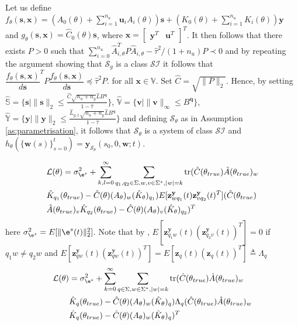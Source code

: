 \documentclass{ifacconf}
\def\rvq{{\mathbf{q}}}
\def\rvw{{\mathbf{w}}}
\def\rvy{{\mathbf{y}}}
\def\rvz{{\mathbf{z}}}
\def\vs{{\bm{s}}}
\def\vu{{\bm{u}}}
\def\vv{{\bm{v}}}
\def\vx{{\bm{x}}}
\def\vy{{\bm{y}}}
\newcommand{\class}{\(\mathcal{SI}\)}
\begin{document}
 \begin{pf}
Let us define $f_{\theta}(\vs,\vx)=(A_{0}(\theta)+\sum_{i=1}^{n_u} \vu_i A_{i}(\theta))\vs+(K_{0}(\theta)+\sum_{i=1}^{n_u} K_{i}(\theta))\vy$
and $g_{\theta}(\vs,\vx)=\hat{C}_{0}(\theta)\vs$, where $\vx=\begin{bmatrix} \vy^T & \vu^T \end{bmatrix}^T$.
It then follows that there exists $P > 0$ such that $\sum_{i=0}^{n_u} \hat{A}_{i,\theta}^T P \hat{A}_{i,\theta} - \hat{\tau}^2/(1+n_u) P \prec 0$ and by repeating the argument showing that $\mathcal{S}_g$ is a class \class{} it follows that
$\dfrac{f_{\theta}(\vs,\vx)}{d\vs}^T P \dfrac{f_{\theta}(\vs,\vx)}{d\vs} \preceq \hat{\tau}^2 P$.
for all $\vx \in \mathbb{V}$. 
Set $\hat{C}=\sqrt{\|P\|_2}$. 
Hence, by setting $\hat{\mathbb{S}}=\{ \vs \mid \|\vs\|_2 \le \frac{\hat{C}\sqrt{n_u+n_y}\hat{L}B^{\rvq}}{1-\hat{\tau}} \}$, 
$\hat{\mathbb{V}}=\{\vv \mid \|\vv\|_{\infty} \le B^{\rvq}\}$, 
$\hat{\mathbb{Y}}=\{\vy \mid \|\vy\|_2 \le \frac{\hat{L}_{g,1}\sqrt{n_u+n_y}\hat{L}B^{\rvq}}{1-\hat{\tau}} \}$
and defining $\mathcal{S}_{\theta}$ as in Assumption \ref{as:parametrisation}, it follows that
$\mathcal{S}_{\theta}$ is a system of class \class{} and 
$h_{\theta}(\{\rvw(s)\}_{s=0}^{t}) = \rvy_{\mathcal{S}_{\theta}}(s_0,0,\rvw;t)$.
\end{pf}
 \begin{pf}
\begin{equation}
\begin{aligned}
    &\mathcal{L}(\theta)=\sigma^2_{\e^s} +\sum_{k,l=0}^{\infty} \sum_{q_1,q_2 \in \Sigma, w,v \in \Sigma^{*},|w|=k}
   \mathrm{tr} (\hat{C}(\theta_{true}) \hat{A}(\theta_{true})_{w} \\
   &\hat{K}_{q_1}(\theta_{true}) - \hat{C}(\theta) (A_{\theta})_w (\hat{K}_\theta)_{q_1}) E[\rvz^{\rvy}_{wq_1}(t)\rvz^{\rvy}_{vq_2}(t)^T](\hat{C}(\theta_{true}) \\
   &\hat{A}(\theta_{true})_{v} \hat{K}_{q_2}(\theta_{true}) - \hat{C}(\theta) (A_{\theta})_v (\hat{K}_\theta)_{q_2})^T  
\end{aligned}
\end{equation}
here $\sigma^{2}_{\e^s}=E[\|\e^s(t)\|^2_2]$.
Note that by \cite{TAC:MPRV}, $E[\rvz^{\rvy}_{q_1w}(t)(\rvz_{q_2v}^{\rvy}(t))^T]=0$ if $q_1w \ne q_2w$ and 
$E[\rvz_{qw}^{\rvy}(t)(\rvz_{qw}^{\rvy}(t))^T]=E[\rvz_q(t)(\rvz_q(t))^T] \triangleq \Lambda_q$
\begin{equation}
\begin{aligned}
 \mathcal{L}(\theta)&=\sigma^2_{\e^s}+\sum_{k=0}^{\infty} \sum_{q \in \Sigma, w \in \Sigma^{*},|w|=k}
   \mathrm{tr} (\hat{C}(\theta_{true}) \hat{A}(\theta_{true})_{w} \\
   &\hat{K}_{q}(\theta_{true}) - \hat{C}(\theta) (A_{\theta})_w (\hat{K}_\theta)_{q}) 
   \Lambda_q (\hat{C}(\theta_{true}) \hat{A}(\theta_{true})_{w} \\
   &\hat{K}_{q}(\theta_{true}) 
   - \hat{C}(\theta) (A_{\theta})_w (\hat{K}_\theta)_{q})^T
\end{aligned}
\end{equation}
\end{pf}
\end{document}
